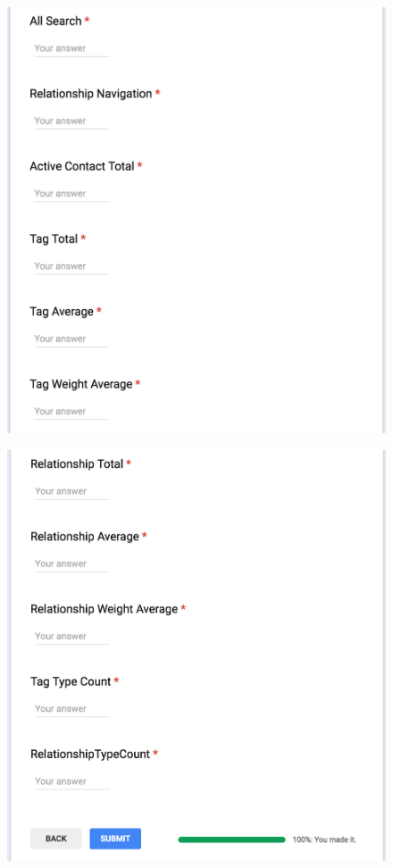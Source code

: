 \documentclass{uofsthesis-cs}
\begin{document}
\begin{figure}[!h]
\begin{center}
\includegraphics[scale=0.4]{pics/survey6.png}
\end{center}
\end{figure}

\begin{figure}[!h]
\begin{center}
\includegraphics[scale=0.4]{pics/survey7.png}
\end{center}
\end{figure}
\end{document}
